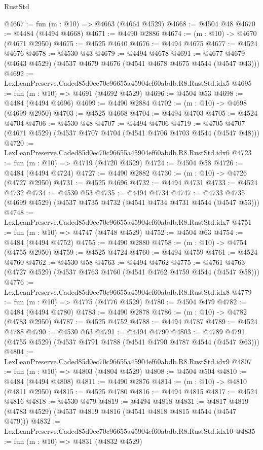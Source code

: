 \begin{lexlean}{RustStd}
\begin{coremodule}
@4667 := fun (m : @10) => @4663 (@4664 @4529)
@4668 := @4504 @48
@4670 := @4484 (@4494 @4668)
@4671 := @4490 @2886
@4674 := (m : @10) -> @4670 (@4671 @2950)
@4675 := @4525 @4640
@4676 := @4494 @4675
@4677 := @4524 @4676
@4678 := @4530 @43
@4679 := @4494 @4678
@4691 := @4677 @4679 (@4643 @4529) (@4537 @4679 @4676 (@4541 @4678 @4675 @4544 (@4547 @43)))
@4692 := LexLeanPreserve.Caded85d0ec70c96655a45904ef60abdb.R8.RustStd.idx5
@4695 := fun (m : @10) => @4691 (@4692 @4529)
@4696 := @4504 @53
@4698 := @4484 (@4494 @4696)
@4699 := @4490 @2884
@4702 := (m : @10) -> @4698 (@4699 @2950)
@4703 := @4525 @4668
@4704 := @4494 @4703
@4705 := @4524 @4704
@4706 := @4530 @48
@4707 := @4494 @4706
@4719 := @4705 @4707 (@4671 @4529) (@4537 @4707 @4704 (@4541 @4706 @4703 @4544 (@4547 @48)))
@4720 := LexLeanPreserve.Caded85d0ec70c96655a45904ef60abdb.R8.RustStd.idx6
@4723 := fun (m : @10) => @4719 (@4720 @4529)
@4724 := @4504 @58
@4726 := @4484 (@4494 @4724)
@4727 := @4490 @2882
@4730 := (m : @10) -> @4726 (@4727 @2950)
@4731 := @4525 @4696
@4732 := @4494 @4731
@4733 := @4524 @4732
@4734 := @4530 @53
@4735 := @4494 @4734
@4747 := @4733 @4735 (@4699 @4529) (@4537 @4735 @4732 (@4541 @4734 @4731 @4544 (@4547 @53)))
@4748 := LexLeanPreserve.Caded85d0ec70c96655a45904ef60abdb.R8.RustStd.idx7
@4751 := fun (m : @10) => @4747 (@4748 @4529)
@4752 := @4504 @63
@4754 := @4484 (@4494 @4752)
@4755 := @4490 @2880
@4758 := (m : @10) -> @4754 (@4755 @2950)
@4759 := @4525 @4724
@4760 := @4494 @4759
@4761 := @4524 @4760
@4762 := @4530 @58
@4763 := @4494 @4762
@4775 := @4761 @4763 (@4727 @4529) (@4537 @4763 @4760 (@4541 @4762 @4759 @4544 (@4547 @58)))
@4776 := LexLeanPreserve.Caded85d0ec70c96655a45904ef60abdb.R8.RustStd.idx8
@4779 := fun (m : @10) => @4775 (@4776 @4529)
@4780 := @4504 @479
@4782 := @4484 (@4494 @4780)
@4783 := @4490 @2878
@4786 := (m : @10) -> @4782 (@4783 @2950)
@4787 := @4525 @4752
@4788 := @4494 @4787
@4789 := @4524 @4788
@4790 := @4530 @63
@4791 := @4494 @4790
@4803 := @4789 @4791 (@4755 @4529) (@4537 @4791 @4788 (@4541 @4790 @4787 @4544 (@4547 @63)))
@4804 := LexLeanPreserve.Caded85d0ec70c96655a45904ef60abdb.R8.RustStd.idx9
@4807 := fun (m : @10) => @4803 (@4804 @4529)
@4808 := @4504 @504
@4810 := @4484 (@4494 @4808)
@4811 := @4490 @2876
@4814 := (m : @10) -> @4810 (@4811 @2950)
@4815 := @4525 @4780
@4816 := @4494 @4815
@4817 := @4524 @4816
@4818 := @4530 @479
@4819 := @4494 @4818
@4831 := @4817 @4819 (@4783 @4529) (@4537 @4819 @4816 (@4541 @4818 @4815 @4544 (@4547 @479)))
@4832 := LexLeanPreserve.Caded85d0ec70c96655a45904ef60abdb.R8.RustStd.idx10
@4835 := fun (m : @10) => @4831 (@4832 @4529)

\end{coremodule}
\end{lexlean}
